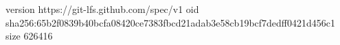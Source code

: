 version https://git-lfs.github.com/spec/v1
oid sha256:65b2f0839b40bcfa08420ce7383fbcd21adab3e58cb19bcf7dedff0421d456c1
size 626416
